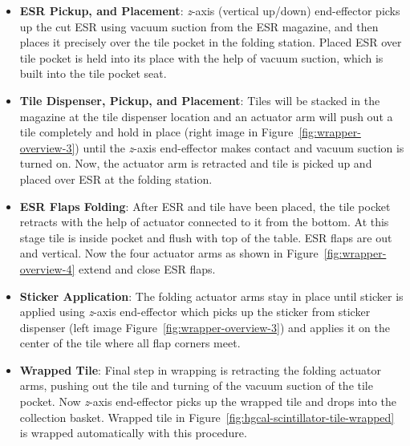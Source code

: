 \begin{itemize}
  \item \textbf{ESR Pickup, and Placement}: \textit{z}-axis (vertical up/down) end-effector
        picks up the cut \gls{ESR} using vacuum suction from the \gls{ESR} magazine,
        and then places it precisely over the tile pocket in the folding station.
        Placed \gls{ESR} over tile pocket is held into its place with
        the help of vacuum suction, which is built into the tile pocket
        seat.
  \item \textbf{Tile Dispenser, Pickup, and Placement}:
        Tiles will be stacked in the magazine at the tile dispenser
        location and an actuator arm will push out a tile
        completely and hold in place (right image in Figure~\ref{fig:wrapper-overview-3}) until the \textit{z}-axis end-effector
        makes contact and vacuum suction is turned on. Now,
        the actuator arm is retracted and tile is
        picked up and placed over \gls{ESR} at the folding station.
  \item \textbf{ESR Flaps Folding}:
        After \gls{ESR} and tile have been placed, the tile pocket
        retracts with the help of actuator connected to it from the bottom.
        At this stage tile is inside pocket and flush with top of the table.
        \gls{ESR} flaps are out and vertical.
        Now the four actuator arms as shown in Figure~\ref{fig:wrapper-overview-4}
        extend and close \gls{ESR} flaps.
  \item \textbf{Sticker Application}:
        The folding actuator arms stay in place until sticker is
        applied using \textit{z}-axis end-effector which
        picks up the sticker from sticker dispenser (left image Figure~\ref{fig:wrapper-overview-3}) and applies it on
        the center of the tile where all flap corners meet.
  \item \textbf{Wrapped Tile}:
        Final step in wrapping is retracting the folding actuator arms,
        pushing out the tile and turning of the vacuum suction of the tile pocket.
        Now \textit{z}-axis end-effector picks up the wrapped tile and
        drops into the collection basket.
        Wrapped tile in Figure~\ref{fig:hgcal-scintillator-tile-wrapped}
        is wrapped automatically with this procedure.
\end{itemize}

